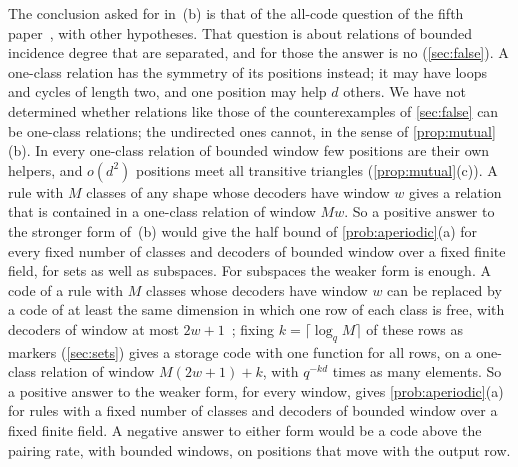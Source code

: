The conclusion asked for in~(b) is that of the all-code question of the fifth
paper~\cite[Question~9.1]{DirectedRecovery2026}, with other hypotheses. That question is about relations of bounded
incidence degree that are separated, and for those the answer is no (\cref{sec:false}). A one-class relation has
the symmetry of its positions instead; it may have loops and cycles of length two, and one position may help $d$
others. We have not determined whether relations like those of the counterexamples of \cref{sec:false} can be
one-class relations; the undirected ones cannot, in the sense of \cref{prop:mutual}(b). In every one-class
relation of bounded window few positions are their own helpers, and $o(d^2)$ positions meet all transitive triangles
(\cref{prop:mutual}(c)). A rule with $M$ classes of any shape whose decoders have window $w$ gives a relation that is
contained in a one-class relation of window $Mw$. So a positive answer to the stronger form of~(b) would give the
half bound of \cref{prob:aperiodic}(a) for every fixed number of classes and decoders of bounded window over a fixed
finite field, for sets as well as subspaces. For subspaces the weaker form is enough. A code of a rule with $M$
classes whose decoders have window $w$ can be replaced by a code of at least the same dimension in which one row of
each class is free, with decoders of window at most
$2w+1$~\cite[Theorem~4.1]{SharedDecoders2026}; fixing $k=\lceil\log_qM\rceil$ of these rows as markers
(\cref{sec:sets}) gives a storage code with one function for all rows, on a one-class relation of window
$M(2w+1)+k$, with $q^{-kd}$ times as many elements. So a positive answer to the weaker form, for every window, gives
\cref{prob:aperiodic}(a) for rules with a fixed number of classes and decoders of bounded window over a fixed finite
field. A negative answer to either form would be a code above the pairing rate, with bounded windows, on positions
that move with the output row.

